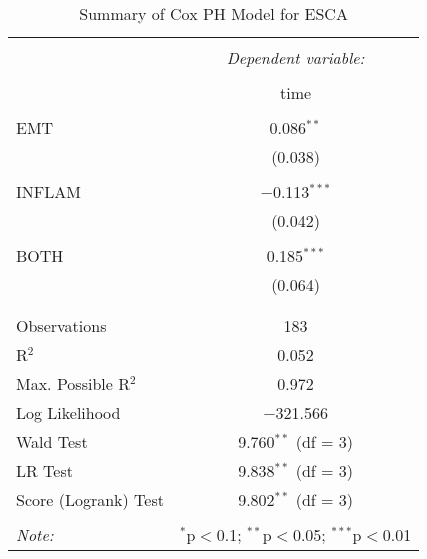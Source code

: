 
\begin{table}[!htbp] \centering 
  \caption{Summary of Cox PH Model for ESCA} 
  \label{table:ESCA_cph} 
\begin{tabular}{@{\extracolsep{5pt}}lc} 
\\[-1.8ex]\hline 
\hline \\[-1.8ex] 
 & \multicolumn{1}{c}{\textit{Dependent variable:}} \\ 
\cline{2-2} 
\\[-1.8ex] & time \\ 
\hline \\[-1.8ex] 
 EMT & 0.086$^{**}$ \\ 
  & (0.038) \\ 
  & \\ 
 INFLAM & $-$0.113$^{***}$ \\ 
  & (0.042) \\ 
  & \\ 
 BOTH & 0.185$^{***}$ \\ 
  & (0.064) \\ 
  & \\ 
\hline \\[-1.8ex] 
Observations & 183 \\ 
R$^{2}$ & 0.052 \\ 
Max. Possible R$^{2}$ & 0.972 \\ 
Log Likelihood & $-$321.566 \\ 
Wald Test & 9.760$^{**}$ (df = 3) \\ 
LR Test & 9.838$^{**}$ (df = 3) \\ 
Score (Logrank) Test & 9.802$^{**}$ (df = 3) \\ 
\hline 
\hline \\[-1.8ex] 
\textit{Note:}  & \multicolumn{1}{r}{$^{*}$p$<$0.1; $^{**}$p$<$0.05; $^{***}$p$<$0.01} \\ 
\end{tabular} 
\end{table} 
